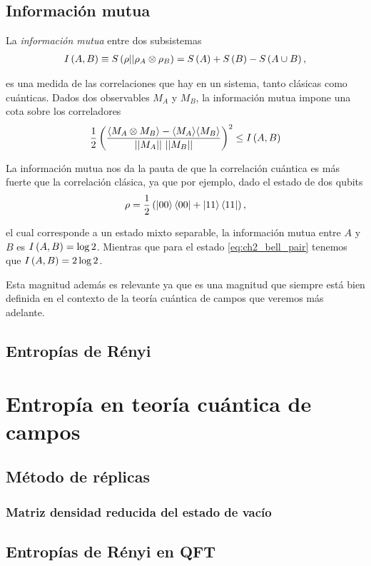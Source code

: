\documentclass[../main.tex]{subfiles}
\begin{document}
\subsection{Información mutua}

La \textit{información mutua} entre dos subsistemas
\begin{align}
	I\left ( A, B \right ) \equiv S\left ( \rho || \rho_A \otimes \rho_B \right ) = S\left ( A \right ) + S\left ( B \right ) - S\left ( A \cup B \right ),
\end{align}

\noindent es una medida de las correlaciones que hay en un sistema, tanto clásicas como cuánticas. Dados dos observables $M_A$ y $M_B$, la información mutua impone una cota sobre los correladores
\begin{align}
	\frac 12 \left ( \frac{\langle M_A \otimes M_B \rangle - \langle M_A \rangle \langle M_B \rangle}{||M_A|| \ ||M_B||} \right )^2 \leq I\left ( A, B \right )
\end{align}

La información mutua nos da la pauta de que la correlación cuántica es más fuerte que la correlación clásica, ya que por ejemplo, dado el estado de dos qubits
\begin{align}
	\rho = \frac 12\left ( \left | 0 0 \right \rangle \left \langle 0 0 \right | + \left | 1 1 \right \rangle \left \langle 1 1 \right | \right ),
\end{align}

\noindent el cual corresponde a un estado mixto separable, la información mutua entre $A$ y $B$ es $I\left ( A, B \right ) = \log 2$. Mientras que para el estado \eqref{eq:ch2_bell_pair} tenemos que $I\left ( A, B \right ) = 2 \log 2$.

Esta magnitud además es relevante ya que es una magnitud que siempre está bien definida en el contexto de la teoría cuántica de campos que veremos más adelante.

\subsection{Entropías de Rényi}

\section{Entropía en teoría cuántica de campos}

\subsection{Método de réplicas}

\subsubsection{Matriz densidad reducida del estado de vacío}

\subsection{Entropías de Rényi en QFT}
\end{document}
